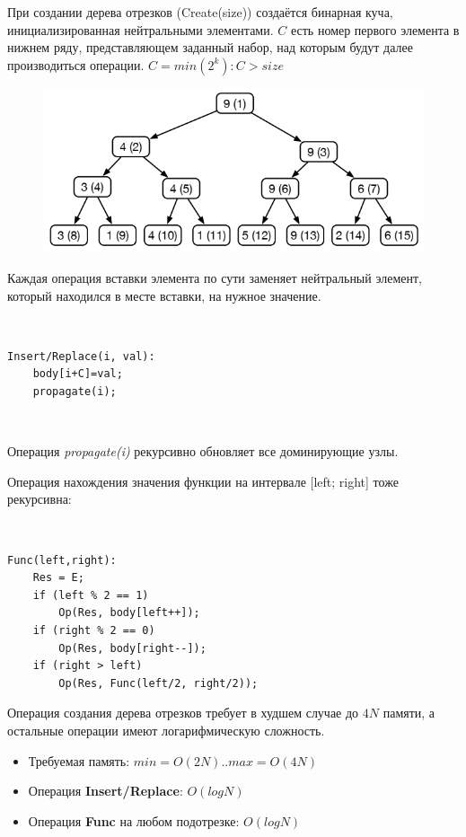 \documentclass{beamer}
\begin{document}
\begin{frame}
	При создании дерева отрезков (Create(size)) создаётся бинарная куча, инициализированная нейтральными элементами. 
	$C$ есть номер первого элемента в нижнем ряду, представляющем заданный набор, над которым будут далее производиться операции. $C = min(2^k) : C > size$
	\begin{figure}[h]
		\centering
		\includegraphics[scale=0.5]{images/lec07-pic24.png}
	\end{figure}	
\end{frame}

\begin{frame}[fragile]
	Каждая операция вставки элемента по сути заменяет нейтральный элемент, который находился в месте вставки, на нужное значение. 
	
	~

	\begin{verbatim}
Insert/Replace(i, val):
	body[i+C]=val; 
	propagate(i);
	\end{verbatim}
	
	~
	
	Операция \textit{propagate(i)} рекурсивно обновляет все доминирующие узлы.
\end{frame}

\begin{frame}[fragile]
	Операция нахождения значения функции на интервале [left; right] тоже рекурсивна: 
	
	~

	\begin{verbatim}
Func(left,right):
	Res = E;
	if (left % 2 == 1) 
		Op(Res, body[left++]);
	if (right % 2 == 0) 
		Op(Res, body[right--]);
	if (right > left) 
		Op(Res, Func(left/2, right/2));
	\end{verbatim}
\end{frame}

\begin{frame}[fragile]
	Операция создания дерева отрезков требует в худшем случае до $4N$ памяти, а остальные операции имеют логарифмическую сложность.
	\begin{itemize}
		\item Требуемая память: $min=O(2N) .. max=O(4N)$
		\item Операция \textbf{Insert/Replace}: $O(log N)$
		\item Операция \textbf{Func} на любом подотрезке: $O(log N)$	
	\end{itemize}
\end{frame}
\end{document}
